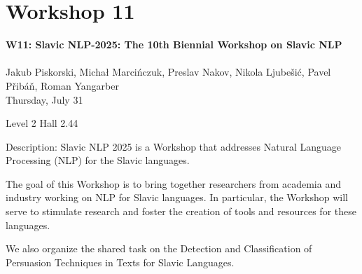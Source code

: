 \clearpage



\section[W11: Slavic NLP-2025: The 10th Biennial Workshop \\
on Slavic NLP]{Workshop 11}
\label{workshop_11}

\begin{center}
    {\Large \textbf{W11: Slavic NLP-2025: The 10th Biennial Workshop on Slavic NLP}}\\
    
\\

   Jakub Piskorski, Michał Marcińczuk, Preslav Nakov, Nikola Ljubešić, Pavel Přibáň, Roman Yangarber\\

    Thursday, July 31
    
   Level 2 Hall 2.44

\end{center}

Description: Slavic NLP 2025 is a Workshop that addresses Natural Language Processing (NLP) for the Slavic languages.

The goal of this Workshop is to bring together researchers from academia and industry working on NLP for Slavic languages. In particular, the Workshop will serve to stimulate research and foster the creation of tools and resources for these languages.

We also organize the shared task on the Detection and Classification of Persuasion Techniques in Texts for Slavic Languages.

